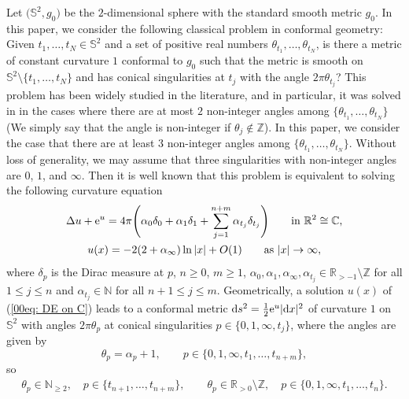 \documentclass[pdftex]{sigma}
\numberwithin{equation}{section}
\def\C{\mathbb C}
\def\R{\mathbb R}
\begin{document}
Let $\bigl(\mathbb{S}^2,g_0\bigr)$ be the $2$-dimensional
sphere with the standard smooth metric $g_0$.
In this paper, we consider the following classical problem in conformal geometry:
Given $t_1,\dots,t_N\in \mathbb{S}^2$ and a set
of positive real numbers $\theta_{t_1},\dots,\theta_{t_N}$, is there
 a metric of constant curvature $1$ conformal to $g_0$
such that the
metric is smooth on $\mathbb{S}^2\setminus\{t_1,\dots,t_N\}$ and has conical
singularities at $t_j$ with the angle $2\pi\theta_{t_j}$? This problem has been widely studied in the literature, and in particular, it
was solved in \cite{Eremenko,Coaxial,EGT} in the cases where there are at
most $2$ non-integer angles among
$\{\theta_{t_1},\dots,\theta_{t_N}\}$ \big(We simply say that the angle
is non-integer if $\theta_j\notin\mathbb{Z}$\big). In this paper, we
consider the case that there are at least $3$ non-integer angles among
$\{\theta_{t_1},\dots,\theta_{t_N}\}$. Without loss of generality, we
may assume that three singularities with non-integer angles are $0$,
$1$, and $\infty$.
Then it is well known that this problem is equivalent to solving
 the following curvature
equation
\begin{gather}
 \Delta u+{\rm e}^u=4\pi\Biggl(\alpha_0\delta_{0}+\alpha_1\delta_{1}
 +\sum_{j=1}^{n+m}\alpha_{t_j}\delta_{t_j}\Biggr)
 \qquad \text{in }\mathbb R^2\cong\C,\nonumber \\
 u(x)=-2(2+\alpha_\infty)\ln|x|+O(1) \qquad \text{as }|x|\to\infty, \label{00eq: DE on C}
 \end{gather}
where $\delta_p$ is the Dirac measure at $p$, $n\geq 0$, $m\geq 1$, $\alpha_0, \alpha_1, \alpha_\infty,
\alpha_{t_j}\in\R_{>-1}\setminus\mathbb{Z}$ for all $1\leq j\leq n$
and $\alpha_{t_j}\in\mathbb{N}$ for all $n+1\leq j\leq
m$. Geometrically, a solution $u(x)$ of (\ref{00eq: DE on C}) leads to
a conformal metric ${\rm d}s^2=\frac12{\rm e}^u|{\rm d}x|^2$ of
curvature $1$ on $\mathbb{S}^2$ with angles $2\pi\theta_{p}$ at conical
singularities $p\in\{0,1,\infty, t_j\}$, where the angles are given by
\begin{equation*} %
 \theta_{p}=\alpha_p+1, \qquad
 p\in \{0,1,\infty, t_1,\dots,t_{n+m}\},
\end{equation*}
so
\begin{gather*} %
 \theta_{p}\in \mathbb{N}_{\geq 2}, \quad
 p\in \{t_{n+1},\dots,t_{n+m}\},\qquad
 \theta_p\in \R_{>0}\setminus\mathbb{Z},\quad p\in\{0,1,\infty,t_1,\dots,t_n\}.
\end{gather*}
\end{document}
